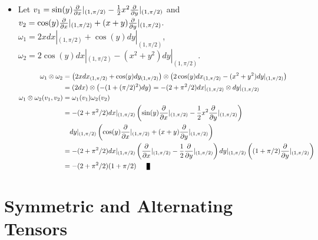 \documentclass[11pt]{article}
\begin{document}
\begin{itemize}
\item \begin{exercise}
Let $v_1 = \sin(y)\frac{\partial }{ \partial x}|_{(1, \pi/2)}   - \frac{1}{2}x^2\frac{\partial }{ \partial y}|_{(1, \pi/2)}$ and $v_2 = \cos(y)\frac{\partial }{ \partial x}|_{(1, \pi/2)}  + (x+y)\frac{\partial }{ \partial y}|_{(1, \pi/2)}$. 
$\omega_1 = 2x dx|_{(1, \pi/2)} + \cos(y)dy|_{(1, \pi/2)}$, $\omega_2 = 2\cos(y) dx|_{(1, \pi/2)} - (x^2 + y^2)dy|_{(1, \pi/2)}$.
\begin{align*}
\omega_1 \otimes \omega_2 &= \paren{2x dx_{(1, \pi/2)} + \cos(y)dy_{(1, \pi/2)}} \otimes \paren{2\cos(y) dx_{(1, \pi/2)} - (x^2 + y^2)dy|_{(1, \pi/2)}}\\
&= \paren{2 dx } \otimes \paren{ - (1 + (\pi/2)^2)dy} = -(2 + \pi^2/2) dx|_{(1, \pi/2)} \otimes dy|_{(1, \pi/2)} \\
\omega_1 \otimes \omega_2(v_1, v_2) &= \omega_1(v_1)\omega_2(v_2)\\
&= -(2 + \pi^2/2) dx|_{(1, \pi/2)}\paren{ \sin(y)\partdiff{}{x}|_{(1, \pi/2)}   - \frac{1}{2}x^2\partdiff{}{y}|_{(1, \pi/2)}} \\
&\quad dy|_{(1, \pi/2)}\paren{\cos(y)\partdiff{}{x}|_{(1, \pi/2)}  + (x+y)\partdiff{}{y}|_{(1, \pi/2)}}\\
&= -(2 + \pi^2/2) dx|_{(1, \pi/2)}\paren{\partdiff{}{x}|_{(1, \pi/2)} - \frac{1}{2}\partdiff{}{y}|_{(1, \pi/2)}}dy|_{(1, \pi/2)}\paren{(1+ \pi/2)\partdiff{}{y}|_{(1, \pi/2)}}\\
&=  -(2 + \pi^2/2)(1+ \pi/2) \qed
\end{align*}
\end{exercise}
\end{itemize}
\section{Symmetric and Alternating Tensors}
\end{document}
